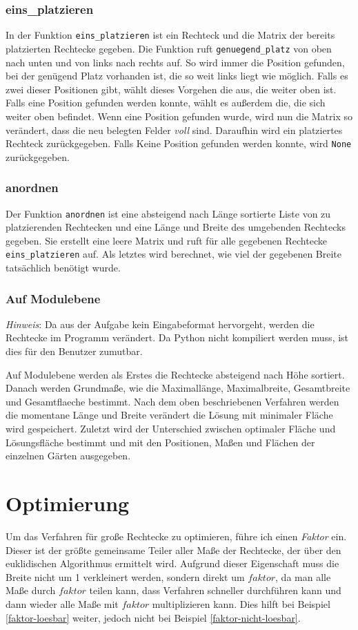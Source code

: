 \documentclass[a4paper,10pt,ngerman]{scrartcl}
\begin{document}
\subsubsection{eins\_platzieren}
In der Funktion \texttt{eins\_platzieren} ist ein Rechteck und die Matrix der bereits platzierten Rechtecke gegeben. Die Funktion ruft \texttt{genuegend\_platz} von oben nach unten und von links nach rechts auf. So wird immer die Position gefunden, bei der genügend Platz vorhanden ist, die so weit links liegt wie möglich. Falls es zwei dieser Positionen gibt, wählt dieses Vorgehen die aus, die weiter oben ist. Falls eine Position gefunden werden konnte, wählt es außerdem die, die sich weiter oben befindet. Wenn eine Position gefunden wurde, wird nun die Matrix so verändert, dass die neu belegten Felder \textit{voll} sind. Daraufhin wird ein platziertes Rechteck zurückgegeben. Falls Keine Position gefunden werden konnte, wird \texttt{None} zurückgegeben.

\subsubsection{anordnen}
Der Funktion \texttt{anordnen} ist eine absteigend nach Länge sortierte Liste von zu platzierenden Rechtecken und eine Länge und Breite des umgebenden Rechtecks gegeben. Sie erstellt eine leere Matrix und ruft für alle gegebenen Rechtecke \texttt{eins\_platzieren} auf. Als letztes wird berechnet, wie viel der gegebenen Breite tatsächlich benötigt wurde.

\subsubsection{Auf Modulebene}
\textit{Hinweis}: Da aus der Aufgabe kein Eingabeformat hervorgeht, werden die Rechtecke im Programm verändert. Da Python nicht kompiliert werden muss, ist dies für den Benutzer zumutbar. 

Auf Modulebene werden als Erstes die Rechtecke absteigend nach Höhe sortiert. Danach werden Grundmaße, wie die Maximallänge, Maximalbreite, Gesamtbreite und Gesamtflaeche bestimmt. Nach dem oben beschriebenen Verfahren werden die momentane Länge und Breite verändert die Lösung mit minimaler Fläche wird gespeichert. Zuletzt wird der Unterschied zwischen optimaler Fläche und Lösungsfläche bestimmt und mit den Positionen, Maßen und Flächen der einzelnen Gärten ausgegeben.

\section{Optimierung}
Um das Verfahren für große Rechtecke zu optimieren, führe ich einen \textit{Faktor} ein. Dieser ist der größte gemeinsame Teiler aller Maße der Rechtecke, der über den euklidischen Algorithmus ermittelt wird. Aufgrund dieser Eigenschaft muss die Breite nicht um 1 verkleinert werden, sondern direkt um $faktor$, da man alle Maße durch $faktor$ teilen kann, dass Verfahren schneller durchführen kann und dann wieder alle Maße mit $faktor$ multiplizieren kann. Dies hilft bei Beispiel \ref{faktor-loesbar} weiter, jedoch nicht bei Beispiel \ref{faktor-nicht-loesbar}.
\end{document}
